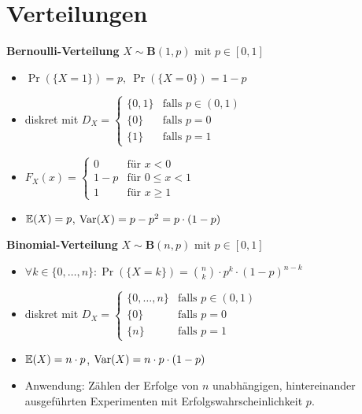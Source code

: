 \section{Verteilungen}

\textbf{Bernoulli-Verteilung} $X\sim\mathbf{B}(1,p)$ mit $p \in [0,1]$
\begin{itemize}
\item $\Pr(\{X=1\}) = p,\ \Pr(\{X=0\}) = 1-p$

\item diskret mit $D_X = \begin{cases}
  \{0,1\}  & \text{falls } p \in (0,1) \\
  \{0\}    & \text{falls } p = 0       \\
  \{1\}    & \text{falls } p = 1
  \end{cases}$

\item $F_X(x) = \begin{cases}
  0    & \text{für } x < 0        \\
  1-p  & \text{für } 0 \leq x <1  \\
  1    & \text{für } x \geq 1
  \end{cases}$

\item $\mathbb{E}(X) = p$, $\operatorname{Var}(X) = p-p^2 = p \cdot (1-p)$

\end{itemize}

\textbf{Binomial-Verteilung} $X\sim\mathbf{B}(n,p)$ mit $p \in [0,1]$
\begin{itemize}
\item $\forall k\in\{0,\ldots,n\}\!:
  \Pr(\{X=k\}) = \binom{n}{k} \cdot p^k\cdot (1-p)^{n-k}$

\item diskret mit
  $D_X = \begin{cases}
  \{0,\ldots,n\}  & \text{falls } p \in (0,1)  \\
  \{0\}           & \text{falls } p = 0        \\
  \{n\}           & \text{falls } p = 1
  \end{cases}$

\item $\mathbb{E}(X) = n \cdot p$, $\operatorname{Var}(X) = n \cdot p \cdot (1-p)$

\item Anwendung: Zählen der Erfolge von $n$ unabhängigen, hintereinander
  ausgeführten Experimenten mit Erfolgswahrscheinlichkeit $p$.
\end{itemize}

